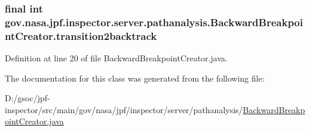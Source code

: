 \subsubsection[{\texorpdfstring{transition2backtrack}{transition2backtrack}}]{\setlength{\rightskip}{0pt plus 5cm}final int gov.\+nasa.\+jpf.\+inspector.\+server.\+pathanalysis.\+Backward\+Breakpoint\+Creator.\+transition2backtrack\hspace{0.3cm}{\ttfamily [private]}}\hypertarget{classgov_1_1nasa_1_1jpf_1_1inspector_1_1server_1_1pathanalysis_1_1_backward_breakpoint_creator_a87651f019518dc70a7a7e0439b3f9ae1}{}\label{classgov_1_1nasa_1_1jpf_1_1inspector_1_1server_1_1pathanalysis_1_1_backward_breakpoint_creator_a87651f019518dc70a7a7e0439b3f9ae1}


Definition at line 20 of file Backward\+Breakpoint\+Creator.\+java.



The documentation for this class was generated from the following file\+:\begin{DoxyCompactItemize}
\item 
D\+:/gsoc/jpf-\/inspector/src/main/gov/nasa/jpf/inspector/server/pathanalysis/\hyperlink{_backward_breakpoint_creator_8java}{Backward\+Breakpoint\+Creator.\+java}\end{DoxyCompactItemize}
